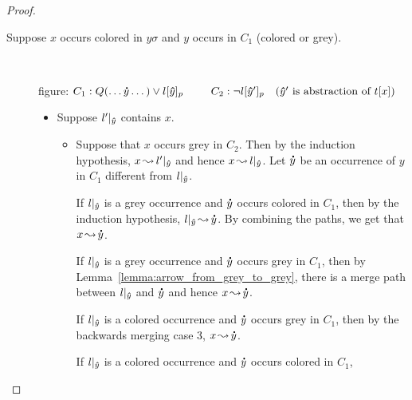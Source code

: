 \documentclass[,%
	paper=a4,%
	DIV10, %
	twoside=false,%
	liststotoc,
	bibtotoc,
	draft=false,%
	numbers=noendperiod
]{scrartcl}
\begin{document}
\begin{proof}
\begin{description}
\begin{itemize}
\begin{itemize}
\begin{itemize}
							\end{itemize}

					\end{itemize}



			\end{itemize}

		\item[Suppose $x$ occurs colored in $y\sigma$ and $y$ occurs in $C_1$ (colored or grey).]
			~

			figure:
			$C_1: Q(\dots \bdot y \dots) \lor l\occat{\bhat y}{p}\quad\quad$
			$C_2: \lnot l{[\bm\hat y']_{p}}\quad(\bm\hat y' \text{ is abstraction of } t[x])$


			\begin{itemize}
				\item Suppose $l'|_{\bm\hat y}$ contains $x$.
					\begin{itemize}
							\item
					Suppose that  $x$ occurs grey in $C_2$. Then by the induction hypothesis,
					$x\operatorname{\leadsto} l'|_{\bm\hat y}$ and hence 
					$x\operatorname{\leadsto} l|_{\bm\hat y}$. Let $\bm\dot y$ be an occurrence of $y$ in $C_1$ different from $l|_{\bm\hat y}$.

					If $l|_{\bm\hat y}$ is a grey occurrence and $\bm\dot y$ occurs colored in $C_1$, then by the induction hypothesis, $l|_{\bm\hat y} \operatorname{\leadsto} \bm\dot y$. By combining the paths, we get that $x\operatorname{\leadsto} \bm\dot y$.

					If $l|_{\bm\hat y}$ is a grey occurrence and $\bm\dot y$ occurs grey in $C_1$, then by Lemma~\ref{lemma:arrow_from_grey_to_grey}, there is a merge path between $l|_{\bm\hat y}$ and $\bm\dot y$ and hence $x\operatorname{\leadsto} \bm\dot y$.


					If $l|_{\bm\hat y}$ is a colored occurrence and $\bm\dot y$ occurs grey in $C_1$, then by the backwards merging case 3, $x\operatorname{\leadsto} \bm\dot y$.

					If $l|_{\bm\hat y}$ is a colored occurrence and $\bm\dot y$ occurs colored in $C_1$,  


\end{itemize}
\end{itemize}
\end{description}
\end{proof}
\end{document}
